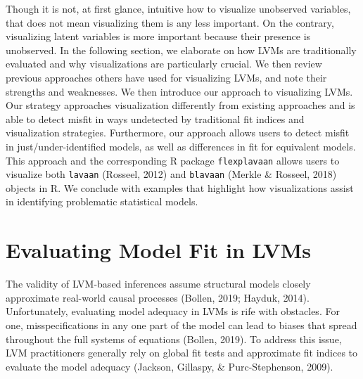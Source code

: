 \documentclass[
  english,
  man]{apa6}
\begin{document}
Though it is not, at first glance, intuitive how to visualize unobserved variables, that does not mean visualizing them is any less important. On the contrary, visualizing latent variables is more important because their presence is unobserved. In the following section, we elaborate on how LVMs are traditionally evaluated and why visualizations are particularly crucial. We then review previous approaches others have used for visualizing LVMs, and note their strengths and weaknesses. We then introduce our approach to visualizing LVMs. Our strategy approaches visualization differently from existing approaches and is able to detect misfit in ways undetected by traditional fit indices and visualization strategies. Furthermore, our approach allows users to detect misfit in just/under-identified models, as well as differences in fit for equivalent models. This approach and the corresponding R package \texttt{flexplavaan} allows users to visualize both \texttt{lavaan} (Rosseel, 2012) and \texttt{blavaan} (Merkle \& Rosseel, 2018) objects in R. We conclude with examples that highlight how visualizations assist in identifying problematic statistical models.

\hypertarget{evaluating-model-fit-in-lvms}{%
\section{Evaluating Model Fit in LVMs}\label{evaluating-model-fit-in-lvms}}

The validity of LVM-based inferences assume structural models closely approximate real-world causal processes (Bollen, 2019; Hayduk, 2014). Unfortunately, evaluating model adequacy in LVMs is rife with obstacles. For one, misspecifications in any one part of the model can lead to biases that spread throughout the full systems of equations (Bollen, 2019). To address this issue, LVM practitioners generally rely on global fit tests and approximate fit indices to evaluate the model adequacy (Jackson, Gillaspy, \& Purc-Stephenson, 2009).
\end{document}
